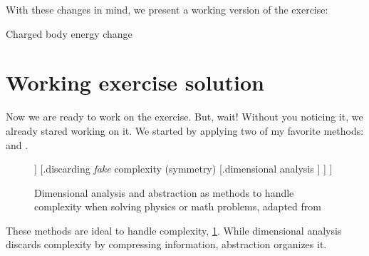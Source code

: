 With these changes in mind, we present a working version of the exercise:
%
\begin{description}
%
\item[Charged body energy change] 
%
\end{description}


\section{Working exercise solution}
%
Now we are ready to work on the exercise. But, wait! Without you noticing it, we already stared working on it. We started by applying two of my favorite methods:  and . 
%
%
\begin{figure}[bt]
  \capstart
  \begin{center}
  \footnotesize
    \Tree [.{how to handle complexity} 
            [.{organizing complexity} 
              [.{abstraction} ] [.{divide and conquer} ] 
            ]
            [.{discarding \emph{fake} complexity (symmetry)} 
              [.{dimensional analysis} ]
             ] 
           ]
  \normalsize
  \end{center}
  \caption[Handling complexity]
    {Dimensional analysis and abstraction as methods to handle complexity when solving physics or math problems, adapted from \cite[p. 2]{sanjoy:2008}}
  \label{fig:handlingcomplexity}
\end{figure}
%
%
%
%
%
These methods are ideal to handle complexity, \vide \cref{fig:handlingcomplexity}. While dimensional analysis discards  complexity by compressing information, abstraction organizes it.

